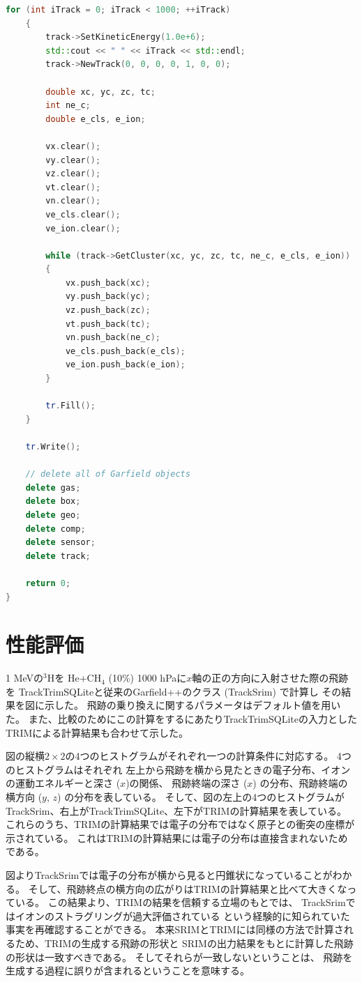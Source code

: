 \documentclass [11pt,a4paper,dvipdfmx] {jarticle}
\begin{document}
\begin{lstlisting}[caption=testTrackTrimSQLite.cpp (TrackTrimSQLiteの使用例。),language={C++},label=lstTrackTrimSQLite]
    for (int iTrack = 0; iTrack < 1000; ++iTrack)
    {
        track->SetKineticEnergy(1.0e+6);
        std::cout << " " << iTrack << std::endl;
        track->NewTrack(0, 0, 0, 0, 1, 0, 0);

        double xc, yc, zc, tc;
        int ne_c;
        double e_cls, e_ion;

        vx.clear();
        vy.clear();
        vz.clear();
        vt.clear();
        vn.clear();
        ve_cls.clear();
        ve_ion.clear();

        while (track->GetCluster(xc, yc, zc, tc, ne_c, e_cls, e_ion))
        {
            vx.push_back(xc);
            vy.push_back(yc);
            vz.push_back(zc);
            vt.push_back(tc);
            vn.push_back(ne_c);
            ve_cls.push_back(e_cls);
            ve_ion.push_back(e_ion);
        }

        tr.Fill();
    }

    tr.Write();

    // delete all of Garfield objects
    delete gas;
    delete box;
    delete geo;
    delete comp;
    delete sensor;
    delete track;

    return 0;
}
\end{lstlisting}
\section{性能評価}

1 MeVの$^3$Hを
He+CH$_4$ (10\%) 1000 hPaに$x$軸の正の方向に入射させた際の飛跡を
TrackTrimSQLiteと従来のGarfield++のクラス (TrackSrim) で計算し
その結果を図に示した。
飛跡の乗り換えに関するパラメータはデフォルト値を用いた。
また、比較のためにこの計算をするにあたりTrackTrimSQLiteの入力としたTRIMによる計算結果も合わせて示した。


図の縦横$2\times2$の4つのヒストグラムがそれぞれ一つの計算条件に対応する。
4つのヒストグラムはそれぞれ
左上から飛跡を横から見たときの電子分布、イオンの運動エネルギーと深さ ($x$)の関係、
飛跡終端の深さ ($x$) の分布、飛跡終端の横方向 ($y$, $z$) の分布を表している。
そして、図の左上の4つのヒストグラムがTrackSrim、右上がTrackTrimSQLite、左下がTRIMの計算結果を表している。
これらのうち、TRIMの計算結果では電子の分布ではなく原子との衝突の座標が示されている。
これはTRIMの計算結果には電子の分布は直接含まれないためである。

図よりTrackSrimでは電子の分布が横から見ると円錐状になっていることがわかる。
そして、飛跡終点の横方向の広がりはTRIMの計算結果と比べて大きくなっている。
この結果より、TRIMの結果を信頼する立場のもとでは、
TrackSrimではイオンのストラグリングが過大評価されている
という経験的に知られていた事実を再確認することができる。
本来SRIMとTRIMには同様の方法で計算されるため、TRIMの生成する飛跡の形状と
SRIMの出力結果をもとに計算した飛跡の形状は一致すべきである。
そしてそれらが一致しないということは、
飛跡を生成する過程に誤りが含まれるということを意味する。
\end{document}
